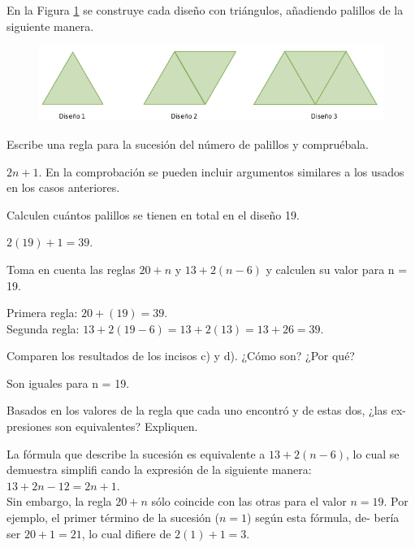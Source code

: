 En la Figura \ref{fig:sucesion_triangulos01} se construye cada diseño con triángulos, añadiendo palillos de la
siguiente manera.

\begin{figure}[H]
    \centering
    \includegraphics[width=.6\linewidth]{../images/sucesion_triangulos01}
    \caption{}
    \label{fig:sucesion_triangulos01}
\end{figure}

\begin{parts}
    Escribe una regla para la sucesión del número de palillos y compruébala.

    \begin{solutionbox}{4em}
        $2n + 1$. En la comprobación se pueden incluir argumentos similares a
        los usados en los casos anteriores.
    \end{solutionbox}

    Calculen cuántos palillos se tienen en total en el diseño 19.

    \begin{solutionbox}{4em}
        $2(19) + 1 = 39$.
    \end{solutionbox}

    Toma en cuenta las reglas $20 + n$ y $13 + 2(n - 6)$ y calculen su valor para n = 19.

    \begin{solutionbox}{5em}
        Primera regla: $20 + (19) = 39$.\\
        Segunda regla: $13 + 2(19 - 6) = 13 + 2(13) = 13 + 26 = 39$.
    \end{solutionbox}

    Comparen los resultados de los incisos c) y d). ¿Cómo son? ¿Por qué?

    \begin{solutionbox}{4em}
        Son iguales para n = 19.
    \end{solutionbox}

    Basados en los valores de la regla que cada uno encontró y de estas dos, ¿las ex-
    presiones son equivalentes? Expliquen.

    \begin{solutionbox}{8em}
        La fórmula que describe la sucesión es equivalente a $13 + 2(n - 6)$,
        lo cual se demuestra simpliﬁ cando la expresión de la siguiente manera:
        $13 + 2n - 12 = 2n + 1$.\\
        Sin embargo, la regla $20 + n$ sólo coincide con las otras para el valor $n = 19$.
        Por ejemplo, el primer término de la sucesión ($n = 1$) según esta fórmula, de-
        bería ser $20 + 1 = 21$, lo cual difiere de $2(1) + 1 = 3$.
    \end{solutionbox}

\end{parts}